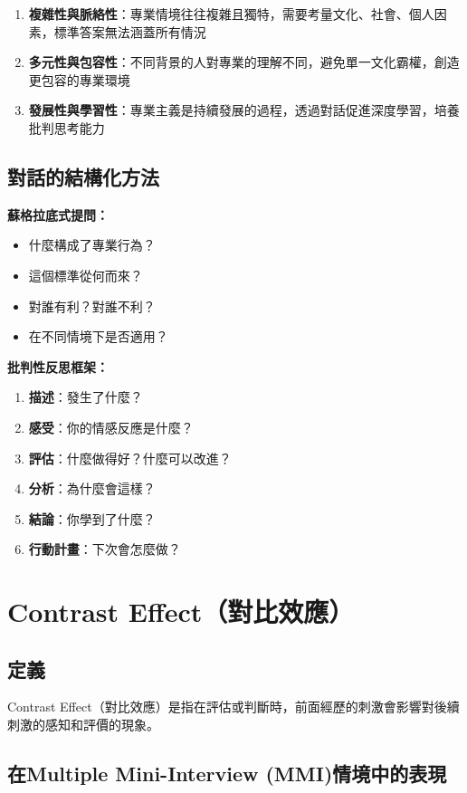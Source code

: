 \documentclass[12pt,a4paper]{article}
\begin{document}
\begin{enumerate}
    \item \textbf{複雜性與脈絡性}：專業情境往往複雜且獨特，需要考量文化、社會、個人因素，標準答案無法涵蓋所有情況
    \item \textbf{多元性與包容性}：不同背景的人對專業的理解不同，避免單一文化霸權，創造更包容的專業環境
    \item \textbf{發展性與學習性}：專業主義是持續發展的過程，透過對話促進深度學習，培養批判思考能力
\end{enumerate}

\subsection{對話的結構化方法}

\textbf{蘇格拉底式提問：}
\begin{itemize}[nosep]
    \item 什麼構成了專業行為？
    \item 這個標準從何而來？
    \item 對誰有利？對誰不利？
    \item 在不同情境下是否適用？
\end{itemize}

\textbf{批判性反思框架：}
\begin{enumerate}
    \item \textbf{描述}：發生了什麼？
    \item \textbf{感受}：你的情感反應是什麼？
    \item \textbf{評估}：什麼做得好？什麼可以改進？
    \item \textbf{分析}：為什麼會這樣？
    \item \textbf{結論}：你學到了什麼？
    \item \textbf{行動計畫}：下次會怎麼做？
\end{enumerate}

\section{Contrast Effect（對比效應）}

\subsection{定義}

Contrast Effect（對比效應）是指在評估或判斷時，前面經歷的刺激會影響對後續刺激的感知和評價的現象。

\subsection{在Multiple Mini-Interview (MMI)情境中的表現}
\end{document}
